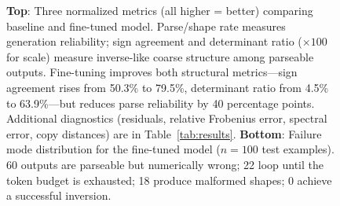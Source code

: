 \begin{figure}[h!]
\caption{
\textbf{Top}: Three normalized metrics (all higher = better) comparing baseline and fine-tuned model. Parse/shape rate measures generation reliability; sign agreement and determinant ratio ($\times 100$ for scale) measure inverse-like coarse structure among parseable outputs. Fine-tuning improves both structural metrics---sign agreement rises from 50.3\% to 79.5\%, determinant ratio from 4.5\% to 63.9\%---but reduces parse reliability by 40 percentage points. Additional diagnostics (residuals, relative Frobenius error, spectral error, copy distances) are in Table~\ref{tab:results}.
\textbf{Bottom}: Failure mode distribution for the fine-tuned model ($n = 100$ test examples). 60 outputs are parseable but numerically wrong; 22 loop until the token budget is exhausted; 18 produce malformed shapes; 0 achieve a successful inversion.}
\label{fig:results}
\end{figure}
